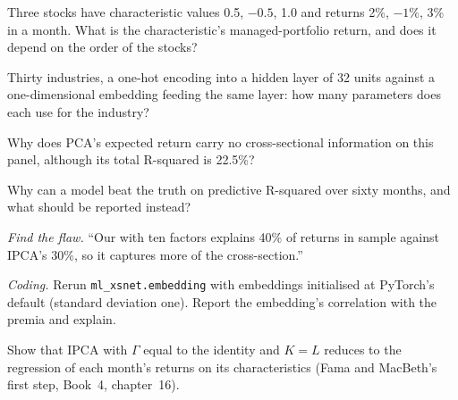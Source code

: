 \begin{exercise}[$\star$]\label{exo:ml:cross-sectional-deep-models:2}
Three stocks have characteristic values 0.5, $-0.5$, 1.0 and returns 2\%, $-1\%$, 3\% in a month. What is the
characteristic's managed-portfolio return, and does it depend on the order of the stocks?
\end{exercise}

\begin{exercise}[$\star$]\label{exo:ml:cross-sectional-deep-models:3}
Thirty industries, a one-hot encoding into a hidden layer of 32 units against a one-dimensional embedding feeding the same
layer: how many parameters does each use for the industry?
\end{exercise}

\begin{exercise}[$\star\star$]\label{exo:ml:cross-sectional-deep-models:4}
Why does PCA's expected return carry no cross-sectional information on this panel, although its total R-squared is 22.5\%?
\end{exercise}

\begin{exercise}[$\star\star$]\label{exo:ml:cross-sectional-deep-models:5}
Why can a model beat the truth on predictive R-squared over sixty months, and what should be reported instead?
\end{exercise}

\begin{exercise}[$\star\star$]\label{exo:ml:cross-sectional-deep-models:6}
\emph{Find the flaw.} ``Our  with ten factors explains 40\% of returns in sample against IPCA's 30\%,
so it captures more of the cross-section.''
\end{exercise}

\begin{exercise}[$\star\star\star$]\label{exo:ml:cross-sectional-deep-models:7}
\emph{Coding.} Rerun \texttt{ml\_xsnet.embedding} with embeddings initialised at PyTorch's default (standard deviation one).
Report the embedding's correlation with the premia and explain.
\end{exercise}

\begin{exercise}[$\star\star\star$]\label{exo:ml:cross-sectional-deep-models:8}
Show that IPCA with $\Gamma$ equal to the identity and $K = L$ reduces to the regression of each month's returns on its
characteristics (Fama and MacBeth's first step, Book~4, chapter~16).
\end{exercise}

